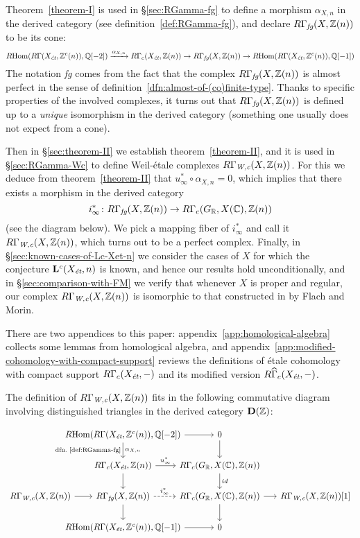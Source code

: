 \documentclass{article}
\numberwithin{equation}{section}
\begin{document}
Theorem~\ref{theorem-I} is used in \S\ref{sec:RGamma-fg} to define a morphism
$\alpha_{X,n}$ in the derived category (see definition~\ref{def:RGamma-fg}),
and declare $R\Gamma_\fg (X, \ZZ(n))$ to be its cone:
\[ \RHom (R\Gamma (X_\et, \ZZ^c (n)), \QQ [-2]) \xrightarrow{\alpha_{X,n}}
  R\Gamma_c (X_\et, \ZZ (n)) \to
  R\Gamma_\fg (X, \ZZ(n)) \to
  \RHom (R\Gamma (X_\et, \ZZ^c (n)), \QQ [-1]) \]
The notation \emph{fg} comes from the fact that the complex
$R\Gamma_\fg (X, \ZZ(n))$ is almost perfect in the sense of
definition~\ref{dfn:almost-of-(co)finite-type}. Thanks to specific properties
of the involved complexes, it turns out that $R\Gamma_\fg (X, \ZZ(n))$ is
defined up to a \emph{unique} isomorphism in the derived category (something one
usually does not expect from a cone).

Then in \S\ref{sec:theorem-II} we establish theorem~\ref{theorem-II}, and it is
used in \S\ref{sec:RGamma-Wc} to define Weil-étale complexes
$R\Gamma_\Wc (X, \ZZ(n))$. For this we deduce from theorem~\ref{theorem-II} that
$u_\infty^* \circ \alpha_{X,n} = 0$, which implies that there exists a morphism
in the derived category
$$i_\infty^*\colon R\Gamma_\fg (X, \ZZ (n)) \to R\Gamma_c (G_\RR, X (\CC), \ZZ(n))$$
(see the diagram below). We pick a mapping fiber of $i_\infty^*$ and call it
$R\Gamma_\Wc (X, \ZZ (n))$, which turns out to be a perfect complex.
Finally, in \S\ref{sec:known-cases-of-Lc-Xet-n} we consider the cases of $X$ for
which the conjecture $\mathbf{L}^c (X_\et, n)$ is known, and hence our results
hold unconditionally, and in \S\ref{sec:comparison-with-FM} we verify that
whenever $X$ is proper and regular, our complex $R\Gamma_\Wc (X, \ZZ (n))$ is
isomorphic to that constructed in \cite{Flach-Morin-2018} by Flach and Morin.

There are two appendices to this paper: appendix~\ref{app:homological-algebra}
collects some lemmas from homological algebra, and
appendix~\ref{app:modified-cohomology-with-compact-support} reviews the
definitions of étale cohomology with compact support $R\Gamma_c (X_\et, -)$
and its modified version $R\widehat{\Gamma}_c (X_\et, -)$.

\vspace{1em}

The definition of $R\Gamma_\Wc (X,\ZZ(n))$ fits in the following commutative
diagram involving distinguished triangles in the derived category
$\mathbf{D} (\ZZ)$:

\[ \begin{tikzcd}[column sep=1.5em]
    &[-3em] \RHom (R\Gamma (X_\et, \ZZ^c (n)), \QQ [-2]) \ar{d}{\alpha_{X,n}}[swap]{\text{dfn.~\ref{def:RGamma-fg}}} \ar{r} &[-2.5em] 0 \ar{d} \\
    & R\Gamma_c (X_\et, \ZZ(n)) \ar{d}\ar{r}{u_\infty^*} & R\Gamma_c (G_\RR, X (\CC), \ZZ(n))\ar{d}{id} \\
    R\Gamma_\Wc (X, \ZZ (n)) \ar{r} & R\Gamma_\fg (X, \ZZ(n)) \ar[dashed]{r}{i_\infty^*}\ar{d} & R\Gamma_c (G_\RR, X (\CC), \ZZ(n)) \ar{r} \ar{d} & R\Gamma_\Wc (X, \ZZ (n)) [1] \\
    & \RHom (R\Gamma (X_\et, \ZZ^c (n)), \QQ [-1]) \ar{r} & 0
\end{tikzcd} \]
\end{document}
